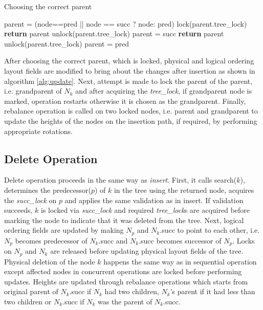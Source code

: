 \documentclass[MTech]{iitmdiss}
\begin{document}
\begin{algorithm}
\caption{Choosing the correct parent}
\begin{algorithmic}[1]
\State parent = (node==pred || node == succ ? node: pred)
\State lock(parent.tree\_lock)
            \State \textbf{return} parent
        \EndIf
        \State unlock(parent.tree\_lock)
        \State parent = succ
    \Else 
            \State \textbf{return} parent
        \EndIf
        \State unlock(parent.tree\_lock)
        \State parent = pred
    \EndIf
\EndWhile
\EndFunction
\end{algorithmic}
\end{algorithm}

After choosing the correct parent, which is locked, physical and logical ordering layout fields are modified to bring about the changes after insertion as shown in algorithm \ref{alg:update}. Next, attempt is made to lock the parent of the parent, i.e. grandparent of $N_k$ and after acquiring the \textit{tree\_lock}, if grandparent node is marked, operation restarts otherwise it is chosen as the grandparent. Finally, rebalance operation is called on two locked nodes, i.e. parent and grandparent to update the heights of the nodes on the insertion path, if required, by performing appropriate rotations. 

\subsection{Delete Operation}
Delete operation proceeds in the same way as \textit{insert}. First, it calls search($k$), determines the predecessor($p$) of $k$ in the tree using the returned node, acquires the \textit{succ\_lock} on $p$ and applies the same validation as in insert. If validation succeeds, $k$ is locked via \textit{succ\_lock} and  required \textit{tree\_lock}s are acquired before marking the node to indicate that it was deleted from the tree. Next, logical ordering fields are updated by making $N_p$ and $N_k$.succ to point to each other, i.e. $N_p$ becomes predecessor of $N_k$.succ and $N_k$.succ becomes successor of $N_p$. Locks on $N_p$ and $N_k$ are released before updating physical layout fields of the tree. Physical deletion of the node $k$ happens the same way as in sequential operation except affected nodes in concurrent operations are locked before performing updates. Heights are updated through rebalance operations which starts from original parent of $N_k$.succ if $N_k$ had two children, $N_k$'s parent if it had less than two children or $N_k$.succ if $N_k$ was the parent of $N_k$.succ. 
\end{document}
